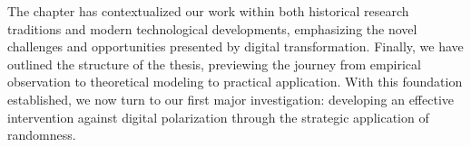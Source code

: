 The chapter has contextualized our work within both historical research traditions and modern technological developments, emphasizing the novel challenges and opportunities presented by digital transformation. Finally, we have outlined the structure of the thesis, previewing the journey from empirical observation to theoretical modeling to practical application. With this foundation established, we now turn to our first major investigation: developing an effective intervention against digital polarization through the strategic application of randomness. 